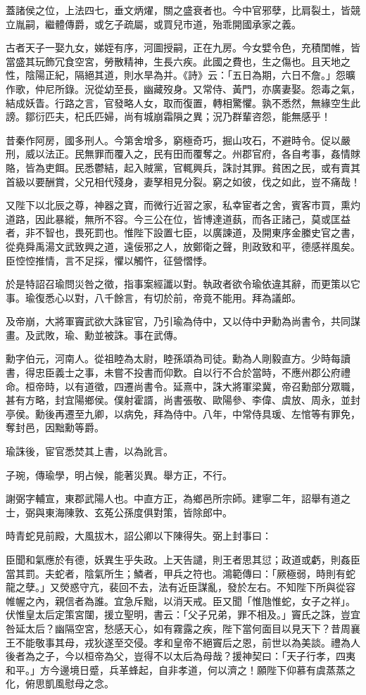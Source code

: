 \begin{pinyinscope}
蓋諸侯之位，上法四七，垂文炳燿，關之盛衰者也。今中官邪孽，比肩裂土，皆競立胤嗣，繼體傳爵，或乞子疏屬，或買兒市道，殆乖開國承家之義。

古者天子一娶九女，娣姪有序，河圖授嗣，正在九房。今女嬖令色，充積閨帷，皆當盛其玩飾冗食空宮，勞散精神，生長六疾。此國之費也，生之傷也。且天地之性，陰陽正紀，隔絕其道，則水旱為并。《詩》云：「五日為期，六日不詹。」怨曠作歌，仲尼所錄。況從幼至長，幽藏歿身。又常侍、黃門，亦廣妻娶。怨毒之氣，結成妖眚。行路之言，官發略人女，取而復置，轉相驚懼。孰不悉然，無緣空生此謗。鄒衍匹夫，杞氏匹婦，尚有城崩霜隕之異；況乃群輩咨怨，能無感乎！

昔秦作阿房，國多刑人。今第舍增多，窮極奇巧，掘山攻石，不避時令。促以嚴刑，威以法正。民無罪而覆入之，民有田而覆奪之。州郡官府，各自考事，姦情賕賂，皆為吏餌。民悉鬱結，起入賊黨，官輒興兵，誅討其罪。貧困之民，或有賣其首級以要酬賞，父兄相代殘身，妻孥相見分裂。窮之如彼，伐之如此，豈不痛哉！

又陛下以北辰之尊，神器之寶，而微行近習之家，私幸宦者之舍，賓客市買，熏灼道路，因此暴縱，無所不容。今三公在位，皆博達道蓺，而各正諸己，莫或匡益者，非不智也，畏死罰也。惟陛下設置七臣，以廣諫道，及開東序金縢史官之書，從堯舜禹湯文武致興之道，遠佞邪之人，放鄭衛之聲，則政致和平，德感祥風矣。臣悾悾推情，言不足採，懼以觸忤，征營慴悸。

於是特詔召瑜問災咎之徵，指事案經讖以對。執政者欲令瑜依違其辭，而更策以它事。瑜復悉心以對，八千餘言，有切於前，帝竟不能用。拜為議郎。

及帝崩，大將軍竇武欲大誅宦官，乃引瑜為侍中，又以侍中尹勳為尚書令，共同謀畫。及武敗，瑜、勳並被誅。事在武傳。

勳字伯元，河南人。從祖睦為太尉，睦孫頌為司徒。勳為人剛毅直方。少時每讀書，得忠臣義士之事，未嘗不投書而仰歎。自以行不合於當時，不應州郡公府禮命。桓帝時，以有道徵，四遷尚書令。延熹中，誅大將軍梁冀，帝召勳部分眾職，甚有方略，封宜陽鄉侯。僕射霍諝，尚書張敬、歐陽參、李偉、虞放、周永，並封亭侯。勳後再遷至九卿，以病免，拜為侍中。八年，中常侍具瑗、左悺等有罪免，奪封邑，因黜勳等爵。

瑜誅後，宦官悉焚其上書，以為訛言。

子琬，傳瑜學，明占候，能著災異。舉方正，不行。

謝弼字輔宣，東郡武陽人也。中直方正，為鄉邑所宗師。建寧二年，詔舉有道之士，弼與東海陳敦、玄菟公孫度俱對策，皆除郎中。

時青蛇見前殿，大風拔木，詔公卿以下陳得失。弼上封事曰：

臣聞和氣應於有德，妖異生乎失政。上天告譴，則王者思其愆；政道或虧，則姦臣當其罰。夫蛇者，陰氣所生；鱗者，甲兵之符也。鴻範傳曰：「厥極弱，時則有蛇龍之孽。」又熒惑守亢，裴回不去，法有近臣謀亂，發於左右。不知陛下所與從容帷幄之內，親信者為誰。宜急斥黜，以消天戒。臣又聞「惟虺惟蛇，女子之祥」。伏惟皇太后定策宮闥，援立聖明，書云：「父子兄弟，罪不相及。」竇氏之誅，豈宜咎延太后？幽隔空宮，愁感天心，如有霧露之疾，陛下當何面目以見天下？昔周襄王不能敬事其母，戎狄遂至交侵。孝和皇帝不絕竇后之恩，前世以為美談。禮為人後者為之子，今以桓帝為父，豈得不以太后為母哉？援神契曰：「天子行孝，四夷和平。」方今邊境日蹙，兵革蜂起，自非孝道，何以濟之！願陛下仰慕有虞蒸蒸之化，俯思凱風慰母之念。


\end{pinyinscope}
